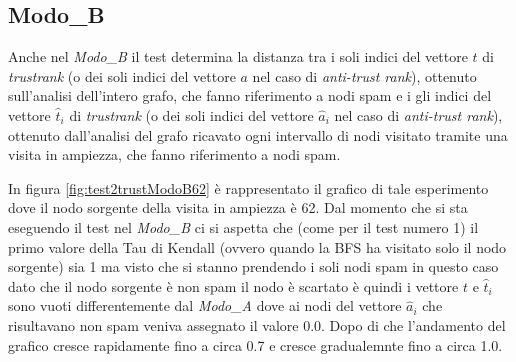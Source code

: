 \subsection{Modo\_B}
Anche nel \textit{Modo\_B} il test determina la distanza tra i soli indici del vettore \(t\) di \textit{trustrank} (o dei soli indici del vettore \(a\) nel caso di \textit{anti-trust rank}), ottenuto sull'analisi dell'intero grafo, che fanno riferimento a nodi spam e i gli indici del vettore \(\hat{t}_i\) di \textit{trustrank} (o dei soli indici del vettore \(\hat{a}_i\) nel caso di \textit{anti-trust rank}), ottenuto dall'analisi del grafo ricavato ogni intervallo di nodi visitato tramite una visita in ampiezza, che fanno riferimento a nodi spam.

In figura \ref{fig:test2trustModoB62} è rappresentato il grafico di tale esperimento dove il nodo sorgente della visita in ampiezza è 62. Dal momento che si sta eseguendo il test nel \textit{Modo\_B} ci si aspetta che (come per il test numero 1) il primo valore della Tau di Kendall (ovvero quando la BFS ha visitato solo il nodo sorgente) sia 1 ma visto che si stanno prendendo i soli nodi spam in questo caso dato che il nodo sorgente è non spam il nodo è scartato è quindi i vettore \(t\) e \(\hat{t}_i\) sono vuoti differentemente dal \textit{Modo\_A} dove ai nodi del vettore \(\hat{a}_i\) che risultavano non spam veniva assegnato il valore 0.0. Dopo di che l'andamento del grafico cresce rapidamente fino a circa 0.7 e cresce gradualemnte fino a circa 1.0. 


